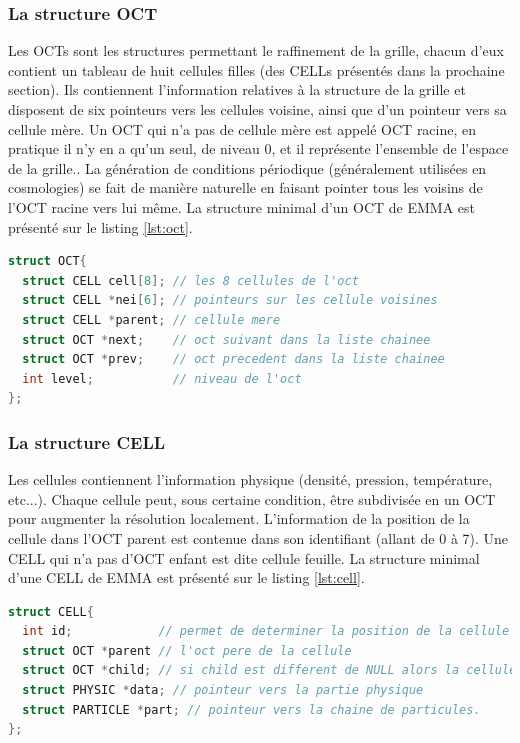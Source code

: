 \subsubsection{La structure OCT}
Les OCTs  sont les structures permettant le raffinement de la grille, chacun d'eux contient un tableau de huit cellules filles (des CELLs présentés dans la prochaine section).
Ils contiennent l'information relatives à la structure de la grille et disposent de six pointeurs vers les cellules voisine, ainsi que d'un pointeur vers sa cellule mère.
Un OCT qui n'a pas de cellule mère est appelé OCT racine, en pratique il n'y en a qu'un seul, de niveau 0, et il représente l'ensemble de l'espace de la grille..
La génération de conditions périodique (généralement utilisées en cosmologies) se fait de manière naturelle en faisant pointer tous les voisins de l'OCT racine vers lui même.
La structure minimal d'un OCT de EMMA est présenté sur le listing \ref{lst:oct}.
\begin{lstlisting}[float=bth,language=C,frame=tb,caption={La structure OCT de EMMA},label=lst:oct]
struct OCT{
  struct CELL cell[8]; // les 8 cellules de l'oct
  struct CELL *nei[6]; // pointeurs sur les cellule voisines
  struct CELL *parent; // cellule mere
  struct OCT *next;    // oct suivant dans la liste chainee
  struct OCT *prev;    // oct precedent dans la liste chainee
  int level;           // niveau de l'oct
};
\end{lstlisting}

\subsubsection{La structure CELL}
\label{sec:CELL}
Les cellules contiennent l'information physique (densité, pression, température, etc...).
Chaque cellule peut, sous certaine condition, être subdivisée en un OCT pour augmenter la résolution localement.
L'information de la position de la cellule dans l'OCT parent est contenue dans son identifiant (allant de 0 à 7).
Une CELL qui n'a pas d'OCT enfant est dite cellule feuille.
La structure minimal d'une CELL de EMMA est présenté sur le listing \ref{lst:cell}.

\begin{lstlisting}[float=bth,language=C,frame=tb,caption={La structure CELL de EMMA},label=lst:cell]
struct CELL{
  int id;            // permet de determiner la position de la cellule dans l'oct
  struct OCT *parent // l'oct pere de la cellule
  struct OCT *child; // si child est different de NULL alors la cellule est raffinee et child point vers l'oct enfant
  struct PHYSIC *data; // pointeur vers la partie physique
  struct PARTICLE *part; // pointeur vers la chaine de particules.
};
\end{lstlisting}


